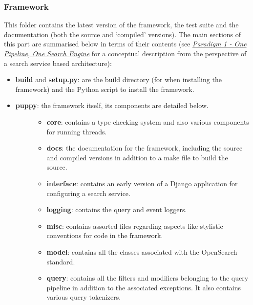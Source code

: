 \documentclass[letterpaper,10pt,english]{sphinxmanual}
\begin{document}
\subsubsection{Framework}
\label{repo:framework}
This folder contains the latest version of the framework, the test suite and the documentation (both the source and `compiled' versions). The main sections of this part are summarised below in terms of their contents (see {\hyperref[service:service-architecture]{\emph{Paradigm 1 - One Pipeline, One Search Engine}}} for a conceptual description from the perspective of a search service based architecture):
\begin{itemize}
\item {} 
\textbf{build} and \textbf{setup.py}: are the build directory (for when installing the framework) and the Python script to install the framework.

\item {} \begin{description}
\item[{\textbf{puppy}: the framework itself, its components are detailed below.}] \leavevmode\begin{itemize}
\item {} 
\textbf{core}: contains a type checking system and also various components for running threads.

\item {} 
\textbf{docs}: the documentation for the framework, including the source and compiled versions in addition to a make file to build the source.

\item {} 
\textbf{interface}: contains an early version of a Django application for configuring a search service.

\item {} 
\textbf{logging}: contains the query and event loggers.

\item {} 
\textbf{misc}: contains assorted files regarding aspects like stylistic conventions for code in the framework.

\item {} 
\textbf{model}: contains all the classes associated with the OpenSearch standard.

\item {} 
\textbf{query}: contains all the filters and modifiers belonging to the query pipeline in addition to the associated exceptions. It also contains various query tokenizers.


\end{itemize}
\end{description}
\end{itemize}
\end{document}
